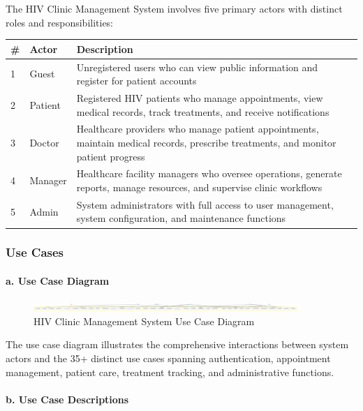 \documentclass[12pt,a4paper]{article}
\begin{document}
The HIV Clinic Management System involves five primary actors with distinct roles and responsibilities:

\begin{longtable}{|p{1cm}|p{3cm}|p{10cm}|}
\hline
\textbf{\#} & \textbf{Actor} & \textbf{Description} \\
\hline
1 & Guest & Unregistered users who can view public information and register for patient accounts \\
\hline
2 & Patient & Registered HIV patients who manage appointments, view medical records, track treatments, and receive notifications \\
\hline
3 & Doctor & Healthcare providers who manage patient appointments, maintain medical records, prescribe treatments, and monitor patient progress \\
\hline
4 & Manager & Healthcare facility managers who oversee operations, generate reports, manage resources, and supervise clinic workflows \\
\hline
5 & Admin & System administrators with full access to user management, system configuration, and maintenance functions \\
\hline
\end{longtable}

\subsubsection{Use Cases}

\paragraph{a. Use Case Diagram}

\begin{figure}[H]
\centering
\includegraphics[width=0.9\textwidth]{diagrams/use_case_diagram}
\caption{HIV Clinic Management System Use Case Diagram}
\label{fig:use-case-diagram}
\end{figure}

The use case diagram illustrates the comprehensive interactions between system actors and the 35+ distinct use cases spanning authentication, appointment management, patient care, treatment tracking, and administrative functions.

\paragraph{b. Use Case Descriptions}
\end{document}
